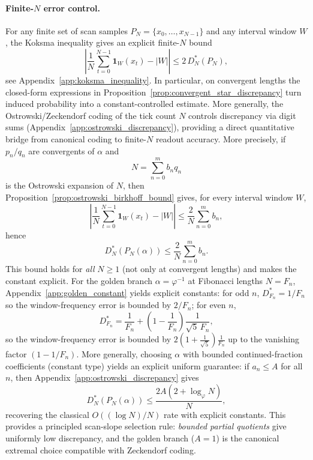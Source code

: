 \paragraph{Finite-$N$ error control.}
For any finite set of scan samples $P_N=\{x_0,\ldots,x_{N-1}\}$ and any interval window $W$, the Koksma inequality gives an explicit finite-$N$ bound
\begin{equation}
\left|\frac{1}{N}\sum_{t=0}^{N-1}\mathbf{1}_W(x_t)-|W|\right|\le 2\,D_N^\ast(P_N),
\end{equation}
see Appendix~\ref{app:koksma_inequality}. In particular, on convergent lengths the closed-form expressions in Proposition~\ref{prop:convergent_star_discrepancy} turn induced probability into a constant-controlled estimate.
More generally, the Ostrowski/Zeckendorf coding of the tick count $N$ controls discrepancy via digit sums (Appendix~\ref{app:ostrowski_discrepancy}), providing a direct quantitative bridge from canonical coding to finite-$N$ readout accuracy.
More precisely, if $p_n/q_n$ are convergents of $\alpha$ and
\begin{equation}
N=\sum_{n=0}^{m} b_n q_n
\end{equation}
is the Ostrowski expansion of $N$, then Proposition~\ref{prop:ostrowski_birkhoff_bound} gives, for every interval window $W$,
\begin{equation}
\left|\frac{1}{N}\sum_{t=0}^{N-1}\mathbf{1}_W(x_t)-|W|\right|
\le \frac{2}{N}\sum_{n=0}^{m} b_n,
\end{equation}
hence
\begin{equation}
D_N^\ast\!\left(P_N(\alpha)\right)\le \frac{2}{N}\sum_{n=0}^{m} b_n.
\label{eq:ostrowski_discrepancy_main}
\end{equation}
This bound holds for \emph{all} $N\ge 1$ (not only at convergent lengths) and makes the constant explicit.
For the golden branch $\alpha=\varphi^{-1}$ at Fibonacci lengths $N=F_n$, Appendix~\ref{app:golden_constant} yields explicit constants: for odd $n$, $D_{F_n}^\ast=1/F_n$ so the window-frequency error is bounded by $2/F_n$; for even $n$,
\begin{equation}
D_{F_n}^\ast=\frac{1}{F_n}+\left(1-\frac{1}{F_n}\right)\frac{1}{\sqrt{5}\,F_n},
\end{equation}
so the window-frequency error is bounded by $2\left(1+\frac{1}{\sqrt{5}}\right)\frac{1}{F_n}$ up to the vanishing factor $(1-1/F_n)$.
More generally, choosing $\alpha$ with bounded continued-fraction coefficients (constant type) yields an explicit uniform guarantee:
if $a_n\le A$ for all $n$, then Appendix~\ref{app:ostrowski_discrepancy} gives
\begin{equation}
D_N^\ast\!\left(P_N(\alpha)\right)\le \frac{2A(2+\log_\varphi N)}{N},
\label{eq:bounded_type_discrepancy_main}
\end{equation}
recovering the classical $O((\log N)/N)$ rate with explicit constants. This provides a principled scan-slope selection rule: \emph{bounded partial quotients} give uniformly low discrepancy, and the golden branch ($A=1$) is the canonical extremal choice compatible with Zeckendorf coding.

